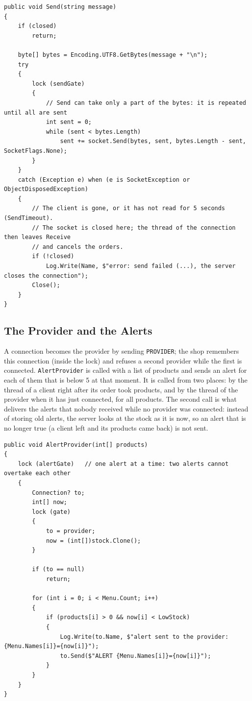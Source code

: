 \documentclass[12pt,a4paper]{article}
\begin{document}
\begin{lstlisting}[style=csharp,caption={Connection.Send}]
public void Send(string message)
{
    if (closed)
        return;

    byte[] bytes = Encoding.UTF8.GetBytes(message + "\n");
    try
    {
        lock (sendGate)
        {
            // Send can take only a part of the bytes: it is repeated until all are sent
            int sent = 0;
            while (sent < bytes.Length)
                sent += socket.Send(bytes, sent, bytes.Length - sent, SocketFlags.None);
        }
    }
    catch (Exception e) when (e is SocketException or ObjectDisposedException)
    {
        // The client is gone, or it has not read for 5 seconds (SendTimeout).
        // The socket is closed here; the thread of the connection then leaves Receive
        // and cancels the orders.
        if (!closed)
            Log.Write(Name, $"error: send failed (...), the server closes the connection");
        Close();
    }
}
\end{lstlisting}

\subsection{The Provider and the Alerts}

A connection becomes the provider by sending \texttt{PROVIDER}; the shop remembers this connection (inside the lock) and refuses a second provider while the first is connected. \texttt{AlertProvider} is called with a list of products and sends an alert for each of them that is below 5 at that moment. It is called from two places: by the thread of a client right after its order took products, and by the thread of the provider when it has just connected, for all products. The second call is what delivers the alerts that nobody received while no provider was connected: instead of storing old alerts, the server looks at the stock as it is now, so an alert that is no longer true (a client left and its products came back) is not sent.

\begin{lstlisting}[style=csharp,caption={Shop.AlertProvider}]
public void AlertProvider(int[] products)
{
    lock (alertGate)   // one alert at a time: two alerts cannot overtake each other
    {
        Connection? to;
        int[] now;
        lock (gate)
        {
            to = provider;
            now = (int[])stock.Clone();
        }

        if (to == null)
            return;

        for (int i = 0; i < Menu.Count; i++)
        {
            if (products[i] > 0 && now[i] < LowStock)
            {
                Log.Write(to.Name, $"alert sent to the provider: {Menu.Names[i]}={now[i]}");
                to.Send($"ALERT {Menu.Names[i]}={now[i]}");
            }
        }
    }
}
\end{lstlisting}
\end{document}
